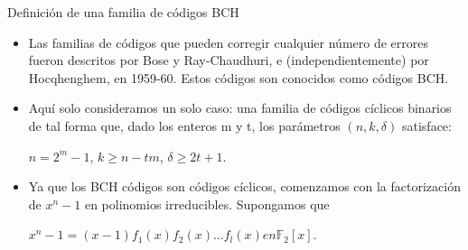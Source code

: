 \begin{frame}  {Definición de una familia de códigos BCH}\small  

\begin{itemize} 

\item  Las familias de códigos que pueden corregir cualquier número de errores fueron descritos por Bose y Ray-Chaudhuri, e (independientemente) por Hocqhenghem, en 1959-60. Estos códigos son conocidos como códigos BCH.

\item Aquí solo consideramos un solo caso: una familia de códigos cíclicos binarios de tal forma que, dado los enteros m y t, los parámetros $(n,k,\delta)$ satisface:

\begin{center}
$n=2^m-1$,	$k\geq n-tm$, 	$\delta\geq 2t+1.$
\end{center}

\item Ya que los BCH códigos son códigos cíclicos, comenzamos con la factorización de $x^n -1$ en polinomios irreducibles. Supongamos que 

\begin{center}
$x^n - 1 = (x - 1)f_1(x)f_2(x) \ldots  f_l(x)	en \mathbb{F}_2[x]$.
\end{center}

\end{itemize} 

\end{frame} 

